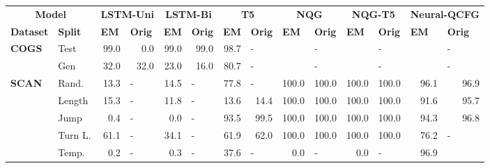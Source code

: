 \begin{table}[]
\scriptsize
\centering
\begin{tabular}{llrlrlrrrrrrll}
\toprule
\multicolumn{2}{c}{\textbf{Model}} &
  \multicolumn{2}{c}{\textbf{LSTM-Uni}} &
  \multicolumn{2}{c}{\textbf{LSTM-Bi}} &
  \multicolumn{2}{c}{\textbf{T5}} &
  \multicolumn{2}{c}{\textbf{NQG}} &
  \multicolumn{2}{c}{\textbf{NQG-T5}} &
  \multicolumn{2}{c}{\textbf{Neural-QCFG}} \\
\textbf{Dataset} &
  \textbf{Split} &
  \multicolumn{1}{l}{\textbf{EM}} &
  \textbf{Orig} &
  \multicolumn{1}{l}{\textbf{EM}} &
  \textbf{Orig} &
  \multicolumn{1}{l}{\textbf{EM}} &
  \multicolumn{1}{l}{\textbf{Orig}} &
  \multicolumn{1}{l}{\textbf{EM}} &
  \multicolumn{1}{l}{\textbf{Orig}} &
  \multicolumn{1}{l}{\textbf{EM}} &
  \multicolumn{1}{l}{\textbf{Orig}} &
  \textbf{EM} &
  \textbf{Orig} \\
  \midrule
\multirow{2}{*}{\textbf{COGS}} &
  Test &
  99.0 &
  \multicolumn{1}{r}{0.0} &
  99.0 &
  \multicolumn{1}{r}{99.0} &
  98.7 &
  \multicolumn{1}{l}{-} &
  \multicolumn{1}{l}{} &
  \multicolumn{1}{l}{-} &
  \multicolumn{1}{l}{} &
  \multicolumn{1}{l}{-} &
   &
  - \\
 &
  Gen &
  32.0 &
  \multicolumn{1}{r}{32.0} &
  23.0 &
  \multicolumn{1}{r}{16.0} &
  80.7 &
  \multicolumn{1}{l}{-} &
  \multicolumn{1}{l}{} &
  \multicolumn{1}{l}{-} &
  \multicolumn{1}{l}{} &
  \multicolumn{1}{l}{-} &
   &
  - \\
  \midrule
\multirow{6}{*}{\textbf{SCAN}} &
  Rand. &
  13.3 &
  - &
  14.5 &
  - &
  77.8 &
  \multicolumn{1}{l}{-} &
  100.0 &
  100.0 &
  100.0 &
  100.0 &
  \multicolumn{1}{r}{96.1} &
  \multicolumn{1}{r}{96.9} \\
 &
  Length &
  15.3 &
  - &
  11.8 &
  - &
  13.6 &
  14.4 &
  100.0 &
  100.0 &
  100.0 &
  100.0 &
  \multicolumn{1}{r}{91.6} &
  \multicolumn{1}{r}{95.7} \\
 &
  Jump &
  0.4 &
  - &
  0.0 &
  - &
  93.5 &
  99.5 &
  100.0 &
  100.0 &
  100.0 &
  100.0 &
  \multicolumn{1}{r}{94.3} &
  \multicolumn{1}{r}{96.8} \\
 &
  Turn L. &
  61.1 &
  - &
  34.1 &
  - &
  61.9 &
  62.0 &
  100.0 &
  100.0 &
  100.0 &
  100.0 &
  \multicolumn{1}{r}{76.2} &
  - \\
 &
  Temp. &
  0.2 &
  - &
  0.3 &
   - &
  37.6 &
  \multicolumn{1}{l}{-} &
  0.0 &
  \multicolumn{1}{l}{-} &
  0.0 &
  \multicolumn{1}{l}{-} &
  \multicolumn{1}{r}{96.9} &

\end{tabular}
\end{table}
